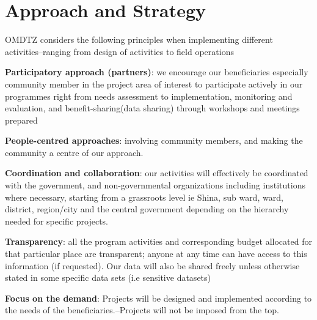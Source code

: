 \documentclass[a4paper,12pt,twoside]{article}
\begin{document}
\newpage
\section{Approach and Strategy}
\label{approachandstrategy}

OMDTZ considers the following principles when implementing different activities--ranging from design of activities to field operations

\textbf{Participatory approach (partners)}: we encourage our beneficiaries especially community member in the project area of interest to participate actively in our programmes right from needs assessment to implementation, monitoring and evaluation, and benefit-sharing(data sharing) through workshops and meetings prepared

\textbf{People-centred approaches}: involving community members, and making the community a centre of our approach.

\textbf{Coordination and collaboration}: our activities will effectively be coordinated with the government, and non-governmental organizations including institutions where necessary, starting from a grassroots level ie Shina, sub ward, ward, district, region/city and the central government depending on the hierarchy needed for specific projects.

\textbf{Transparency}: all the program activities and corresponding budget allocated for that particular place are transparent; anyone at any time can have access to this information (if requested). Our data will also be shared freely unless otherwise stated in some specific data sets (i.e sensitive datasets)

\textbf{Focus on the demand}: Projects will be designed and implemented according to the needs of the beneficiaries.--Projects will not be imposed from the top.

\newpage
\end{document}
